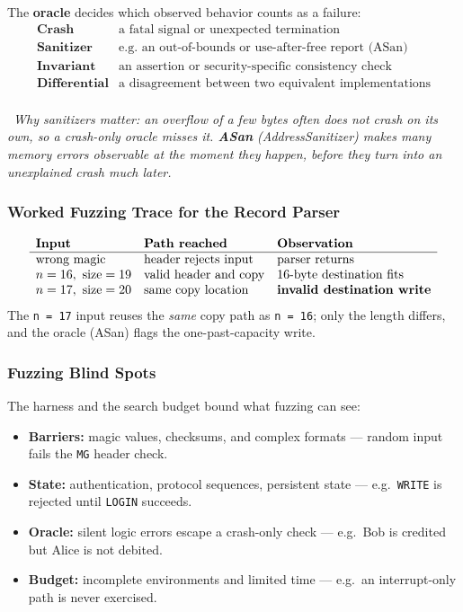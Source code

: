 \documentclass[hidelinks]{article}
\newcommand{\callout}[1]{\par\smallskip\noindent{\color{capri}$\blacktriangleright$}\ \textit{#1}\par\smallskip}
\begin{document}
The \textbf{oracle} decides which observed behavior counts as a failure:
\[
\begin{array}{ll}
\textbf{Crash}        & \text{a fatal signal or unexpected termination}\\
\textbf{Sanitizer}    & \text{e.g.\ an out-of-bounds or use-after-free report (ASan)}\\
\textbf{Invariant}    & \text{an assertion or security-specific consistency check}\\
\textbf{Differential} & \text{a disagreement between two equivalent implementations}\\
\end{array}
\]

\callout{Why sanitizers matter: an overflow of a few bytes often does \emph{not} crash on its own, so a crash-only oracle misses it. \textbf{ASan} (AddressSanitizer) makes many memory errors observable \emph{at the moment they happen}, before they turn into an unexplained crash much later.}

\subsubsection{Worked Fuzzing Trace for the Record Parser}

\[
\begin{array}{lll}
\textbf{Input} & \textbf{Path reached} & \textbf{Observation}\\ \hline
\text{wrong magic}          & \text{header rejects input} & \text{parser returns}\\
n=16,\ \text{size}=19       & \text{valid header and copy} & \text{16-byte destination fits}\\
n=17,\ \text{size}=20       & \text{same copy location}    & \text{\textbf{invalid destination write}}\\
\end{array}
\]
The \texttt{n = 17} input reuses the \emph{same} copy path as \texttt{n = 16}; only the length differs, and the oracle (ASan) flags the one-past-capacity write.

\subsubsection{Fuzzing Blind Spots}

The harness and the search budget bound what fuzzing can see:
\begin{itemize}
    \item \textbf{Barriers:} magic values, checksums, and complex formats --- random input fails the \texttt{MG} header check.
    \item \textbf{State:} authentication, protocol sequences, persistent state --- e.g.\ \texttt{WRITE} is rejected until \texttt{LOGIN} succeeds.
    \item \textbf{Oracle:} silent logic errors escape a crash-only check --- e.g.\ Bob is credited but Alice is not debited.
    \item \textbf{Budget:} incomplete environments and limited time --- e.g.\ an interrupt-only path is never exercised.
\end{itemize}
\end{document}
